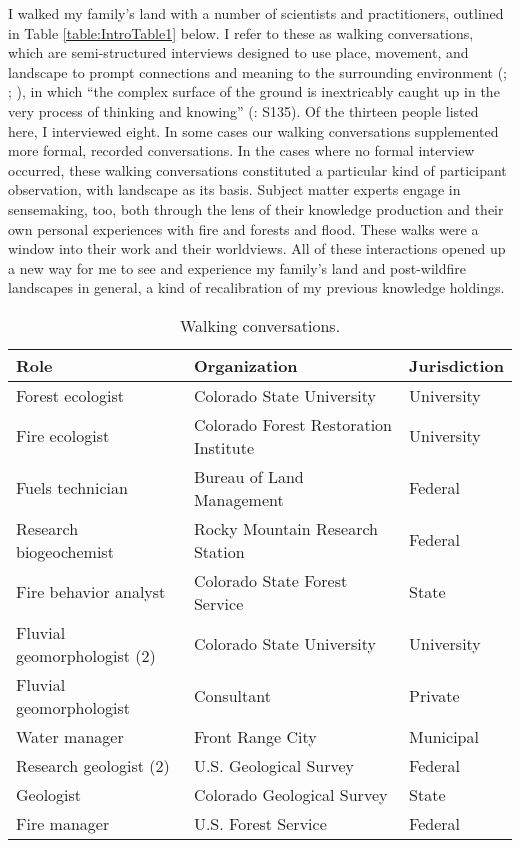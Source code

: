 \documentclass[
]{article}
\begin{document}
I walked my family's land with a number of scientists and practitioners, outlined in Table \ref{table:IntroTable1} below. I refer to these as walking conversations, which are semi-structured interviews designed to use place, movement, and landscape to prompt connections and meaning to the surrounding environment (; ; ), in which ``the complex surface of the ground is inextricably caught up in the very process of thinking and knowing'' (: S135). Of the thirteen people listed here, I interviewed eight. In some cases our walking conversations supplemented more formal, recorded conversations. In the cases where no formal interview occurred, these walking conversations constituted a particular kind of participant observation, with landscape as its basis. Subject matter experts engage in sensemaking, too, both through the lens of their knowledge production and their own personal experiences with fire and forests and flood. These walks were a window into their work and their worldviews. All of these interactions opened up a new way for me to see and experience my family's land and post-wildfire landscapes in general, a kind of recalibration of my previous knowledge holdings.

\captionsetup{width=6.5in}

\begin{table}[!h]
\centering\centering
\caption{\label{tab:IntroTable1}Walking conversations.}
\centering
\begin{tabu} to 
\toprule
Role & Organization & Jurisdiction\\
\midrule
Forest ecologist & Colorado State University & University\\
Fire ecologist & Colorado Forest Restoration Institute & University\\
Fuels technician & Bureau of Land Management & Federal\\
Research biogeochemist & Rocky Mountain Research Station & Federal\\
Fire behavior analyst & Colorado State Forest Service & State\\
\addlinespace
Fluvial geomorphologist (2) & Colorado State University & University\\
Fluvial geomorphologist & Consultant & Private\\
Water manager & Front Range City & Municipal\\
Research geologist (2) & U.S. Geological Survey & Federal\\
Geologist & Colorado Geological Survey & State\\
\addlinespace
Fire manager & U.S. Forest Service & Federal\\
\bottomrule
\end{tabu}
\end{table}
\end{document}
